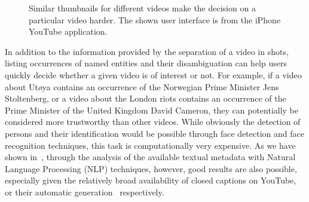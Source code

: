 \documentclass[runningheads,a4paper]{llncs}
\begin{document}
\begin{figure}[htb!]
  \begin{center}
\hspace{10pt}
  \caption{Similar thumbnails for different videos make the decision on a particular video harder. The shown user interface is from the iPhone YouTube application.}
  \label{fig:thumbnails}
  \end{center}  
\end{figure}

In addition to the information provided by the separation of a video in shots, listing occurrences of named entities and their disambiguation can help users quickly decide whether a given video is of interest or not. For example, if a video about Ut\o ya contains an occurrence of the Norwegian Prime Minister Jens Stoltenberg, or a video about the London riots contains an occurrence of the Prime Minister of the United Kingdom David Cameron, they can potentially be considered more trustworthy than other videos. While obviously the detection of persons and their identification would be possible through face detection and face recognition techniques, this task is computationally very expensive. As we have shown in~\cite{semwebvid}, through the analysis of the available textual metadata with Natural Language Processing (NLP) techniques, however, good results are also possible, especially given the relatively broad availability of closed captions on YouTube, or their automatic generation~\cite{youtubecaptions} respectively.
\end{document}
